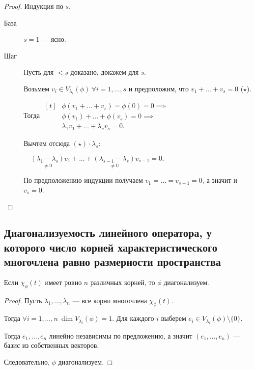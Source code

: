 \begin{proof}
    Индукция по $s$.
    \begin{description}
    \item[База] $s = 1$ --- ясно.
    \item[Шаг] Пусть для $< s$ доказано, докажем для $s$.

        Возьмем $v_i \in V_{\lambda_i}(\phi) \ \forall i = 1, \dots, s$ и предположим, что $v_1 + \dots + v_s = 0$ ($\star$).

        Тогда 
        \begin{math}
            \begin{aligned}[t]
                &\phi(v_1 + \dots + v_s) = \phi(0) = 0 \implies \\ 
                &\phi(v_1) + \dots + \phi(v_s) = 0 \implies \\
                &\lambda_1 v_1 + \dots + \lambda_s v_s = 0.
            \end{aligned}
        \end{math}

        Вычтем отсюда $(\star) \cdot \lambda_s$:

        \begin{math}
            \quad \underset{\neq 0}{(\lambda_1 - \lambda_s)} v_1 + \dots + \underset{\neq 0}{(\lambda_{s - 1} - \lambda_s)} v_{s - 1} = 0.
        \end{math}

        По предположению индукции получаем $v_1 = \dots = v_{s - 1} = 0$, а значит и $v_s = 0$.
        \qedhere
    \end{description}
\end{proof}


\subsection{Диагонализуемость линейного оператора, у которого число корней характеристического многочлена равно размерности пространства}

\begin{corollary}
    Если $\chi_\phi(t)$ имеет ровно $n$ различных корней, то $\phi$ диагонализуем.
\end{corollary}

\begin{proof}
    Пусть $\lambda_1, \dots, \lambda_n$ --- все корни многочлена $\chi_\phi(t)$. 

    Тогда $\forall i = 1, \dots, n \ \dim V_{\lambda_i}(\phi) = 1$. Для каждого $i$ выберем $e_i \in V_{\lambda_i}(\phi) \setminus \{0\}$.

    Тогда $e_1, \dots, e_n$ линейно независимы по предложению, а значит $(e_1, \dots, e_n)$ --- базис из собственных векторов.

    Следовательно, $\phi$ диагонализуем.
\end{proof}

